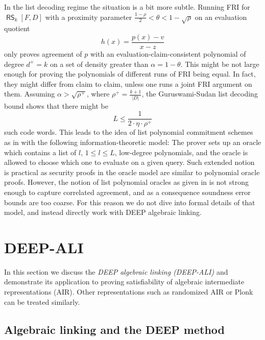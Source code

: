 \documentclass[11pt,article,oneside]{memoir}
\theoremstyle{definition}
\theoremstyle{remark}
\DeclareMathOperator{\RS}{\mathsf{RS}}
\begin{document}
In the list decoding regime the situation is a bit more subtle. 
Running FRI for $\RS_k[F,D]$ with a proximity parameter $\frac{1-\rho}{2}<\theta<1-\sqrt\rho$  on an evaluation quotient
\[
h(x)=\frac{p(x)-v}{x-z}
\]
only proves agreement of $p$ with an evaluation-claim-consistent polynomial of degree $d^+ = k$ on a set of density greater than $\alpha = 1-\theta$. 
This might be not large enough for proving the polynomials of different runs of FRI being equal. 
In fact, they might differ from claim to claim, unless one runs a joint FRI argument on them. 
Assuming $\alpha >\sqrt{\rho^+}$, where $\rho^+ = \frac{k+1}{|D|}$, the Guruswami-Sudan list decoding bound shows that there might be 
\[
L\leq \frac{1}{2\cdot \eta\cdot \rho^+}
\]
such code words. 
This leads to the idea of list polynomial commitment schemes as in \cite{Redshift} with the following information-theoretic model: 
The prover sets up an oracle which contains a list of $l$, $1\leq l\leq L$, low-degree polynomials, and the oracle is allowed to choose which one to evaluate on a given query. 
Such extended notion is practical as security proofs in the oracle model are similar to polynomial oracle proofs.  
However, the notion of list polynomial oracles as given in \cite{Redshift} is not strong enough to capture correlated agreement, and as a consequence soundness error bounds are too coarse. 
For this reason we do not dive into formal details of that model, and instead directly work with DEEP algebraic linking.


\chapter{DEEP-ALI}

In this section we discuss the \textit{DEEP algebraic linking (DEEP-ALI)} \cite{DEEPFRI} and demonstrate its application to proving satisfiability of algebraic intermediate representations (AIR). 
Other representations such as randomized AIR or Plonk \cite{Plonk} can be treated similarly. 

\section{Algebraic linking and the DEEP method}
 
\end{document}
